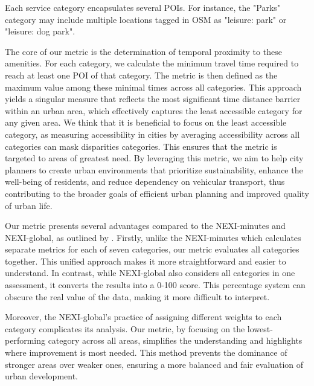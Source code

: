 Each service category encapsulates several POIs. 
For instance, the "Parks" category may include multiple locations tagged in OSM as "leisure: park" or "leisure: dog park".

The core of our metric is the determination of temporal proximity to these amenities. 
For each category, we calculate the minimum travel time required to reach at least one POI of that category. 
The metric is then defined as the maximum value among these minimal times across all categories. 
This approach yields a singular measure that reflects the most significant time distance barrier within an urban area, which effectively captures the least accessible category for any given area.
We think that it is beneficial to focus on the least accessible category, as measuring accessibility in cities by averaging accessibility across all categories can mask disparities categories. 
This ensures that the metric is targeted to areas of greatest need. 
By leveraging this metric, we aim to help city planners to create urban environments that prioritize sustainability, enhance the well-being of residents, and reduce dependency on vehicular transport, thus contributing to the broader goals of efficient urban planning and improved quality of urban life.

Our metric presents several advantages compared to the NEXI-minutes and NEXI-global, as outlined by \cite{olivariAreItalianCities2023}.
Firstly, unlike the NEXI-minutes which calculates separate metrics for each of seven categories, our metric evaluates all categories together. 
This unified approach makes it more straightforward and easier to understand. 
In contrast, while NEXI-global also considers all categories in one assessment, it converts the results into a 0-100 score. 
This percentage system can obscure the real value of the data, making it more difficult to interpret.

Moreover, the NEXI-global's practice of assigning different weights to each category complicates its analysis. 
Our metric, by focusing on the lowest-performing category across all areas, simplifies the understanding and highlights where improvement is most needed. 
This method prevents the dominance of stronger areas over weaker ones, ensuring a more balanced and fair evaluation of urban development. 

